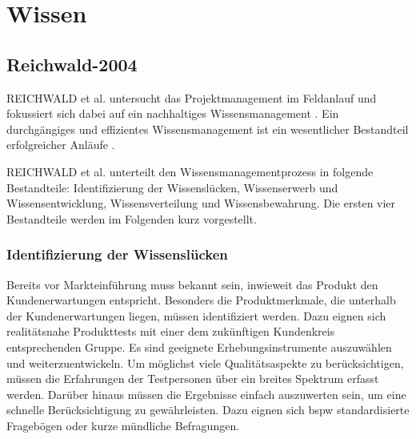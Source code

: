 \section{Wissen}
\subsection*{Reichwald-2004}
REICHWALD et al. untersucht das Projektmanagement im Feldanlauf und fokussiert sich dabei auf ein nachhaltiges Wissensmanagement \autocite{Reichwald2004}. Ein durchgängiges und effizientes Wissensmanagement ist ein wesentlicher Bestandteil erfolgreicher Anläufe \autocite{Kuhn2002}. 

REICHWALD et al. unterteilt den Wissensmanagementprozess in folgende Bestandteile: Identifizierung der Wissenslücken, Wissenserwerb und Wissensentwicklung, Wissensverteilung und Wissensbewahrung. Die ersten vier Bestandteile werden im Folgenden kurz vorgestellt. 

\subsubsection*{Identifizierung der Wissenslücken}
Bereits vor Markteinführung muss bekannt sein, inwieweit das Produkt den Kundenerwartungen entspricht. Besonders die Produktmerkmale, die unterhalb der Kundenerwartungen liegen, müssen identifiziert werden. Dazu eignen sich realitätsnahe Produkttests mit einer dem zukünftigen Kundenkreis entsprechenden Gruppe. Es sind geeignete Erhebungsinstrumente auszuwählen und weiterzuentwickeln. Um möglichst viele Qualitätsaspekte zu berücksichtigen, müssen die Erfahrungen der Testpersonen über ein breites Spektrum erfasst werden. Darüber hinaus müssen die Ergebnisse einfach auszuwerten sein, um eine schnelle Berücksichtigung zu gewährleisten. Dazu eignen sich \gls{bspw} standardisierte Fragebögen oder kurze mündliche Befragungen. 

